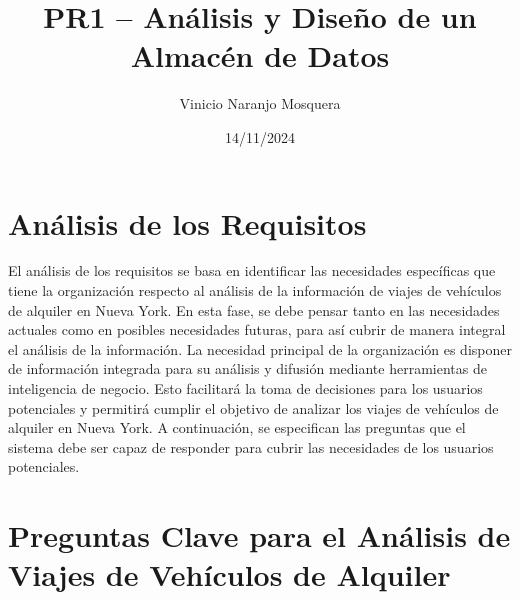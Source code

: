 \documentclass{article}
\title{PR1 – Análisis y Diseño de un Almacén de Datos}
\author{Vinicio Naranjo Mosquera}
\date{14/11/2024}
\begin{document}
\maketitle

\section*{Análisis de los Requisitos}

El análisis de los requisitos se basa en identificar las necesidades específicas que tiene la organización respecto al análisis de la información de viajes de vehículos de alquiler en Nueva York. En esta fase, se debe pensar tanto en las necesidades actuales como en posibles necesidades futuras, para así cubrir de manera integral el análisis de la información. La necesidad principal de la organización es disponer de información integrada para su análisis y difusión mediante herramientas de inteligencia de negocio. Esto facilitará la toma de decisiones para los usuarios potenciales y permitirá cumplir el objetivo de analizar los viajes de vehículos de alquiler en Nueva York.
A continuación, se especifican las preguntas que el sistema debe ser capaz de responder para cubrir las necesidades de los usuarios potenciales.

\section*{Preguntas Clave para el Análisis de Viajes de Vehículos de Alquiler}
\end{document}
